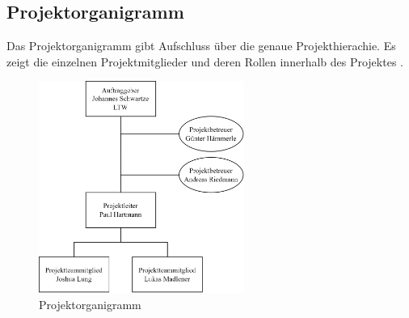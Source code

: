 \subsection{Projektorganigramm}

Das Projektorganigramm gibt Aufschluss über die genaue Projekthierachie. Es zeigt die einzelnen Projektmitglieder und deren Rollen innerhalb des Projektes .

\begin{figure}[H]
  \centering
  \includegraphics[width=0.6\textwidth]{images/projektorganigramm.png}
  \caption{Projektorganigramm}
  \label{fig:projektorganigramm}
\end{figure}
